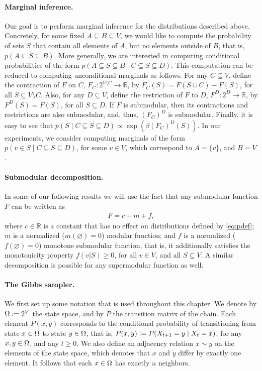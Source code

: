 \paragraph{Marginal inference.}
Our goal is to perform marginal inference for the distributions described above.
Concretely, for some fixed $A \subseteq B \subseteq V$, we would like to compute the probability of sets $S$ that contain all elements of $A$, but no elements outside of $B$, that is, $p(A \subseteq S \subseteq B)$.
More generally, we are interested in computing conditional probabilities of the form $p(A \subseteq S \subseteq B \mid C \subseteq S \subseteq D)$.
This computation can be reduced to computing unconditional marginals as follows.
For any $C \subseteq V$, define the contraction of $F$ on $C$, $F_C : 2^{V \setminus C} \to \mathbb{R}$, by $F_C(S) = F(S \cup C) - F(S)$, for all $S \subseteq V \setminus C$.
Also, for any $D \subseteq V$, define the restriction of $F$ to $D$, $F^D : 2^D \to \mathbb{R}$, by $F^D(S) = F(S)$, for all $S \subseteq D$.
If $F$ is submodular, then its contractions and restrictions are also submodular, and, thus, $(F_C)^D$ is submodular.
Finally, it is easy to see that $p(S \mid C \subseteq S \subseteq D) \propto \exp(\beta (F_C)^D(S))$.
In our experiments, we consider computing marginals of the form $p(v \in S \mid C \subseteq S \subseteq D)$, for some $v \in V$, which correspond to $A = \{v\}$, and $B = V$.

\paragraph{Submodular decomposition.}
In some of our following results we will use the fact that any submodular function $F$ can be written as
\begin{align} \label{eq:decomp}
  F = c + m + f,
\end{align}
where $c \in \mathbb{R}$ is a constant that has no effect on distributions defined by \eqref{eq:pdef}; $m$ is a normalized ($m(\varnothing) = 0$) modular function; and $f$ is a normalized ($f(\varnothing) = 0$) monotone submodular function, that is, it additionally satisfies the monotonicity property $f(v|S) \geq 0$, for all $v \in V$, and all $S \subseteq V$.
A similar decomposition is possible for any supermodular function as well.

\paragraph{The Gibbs sampler.}
We first set up some notation that is used throughout this chapter.
We denote by $\ss \defeq 2^V$ the state space, and by $P$ the transition matrix of the chain.
Each element $P(x, y)$ corresponds to the conditional probability of transitioning from state $x \in \ss$ to state $y \in \ss$, that is, $P(x, y) \defeq P(X_{t+1} = y \mid X_{t} = x)$, for any $x, y \in \ss$, and any $t \geq 0$.
We also define an adjacency relation $x \sim y$ on the elements of the state space, which denotes that $x$ and $y$ differ by exactly one element.
It follows that each $x \in \ss$ has exactly $n$ neighbors.

